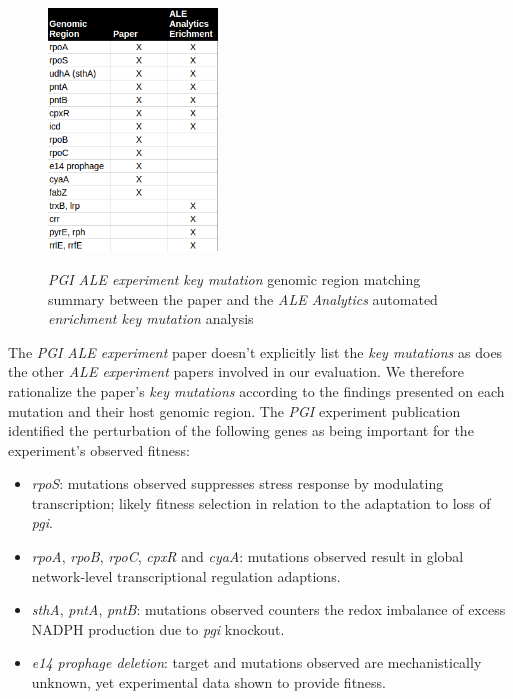\documentclass[12pt,final,masters,chapterheads]{ucsd}  %
\begin{document}
\begin{figure}[H]
  \caption{\textit{PGI} \textit{ALE experiment} \textit{key mutation} genomic region matching summary between the paper and the \textit{ALE Analytics} automated \textit{enrichment key mutation} analysis}
  \centering
  \includegraphics[width=0.4\textwidth]{pgi_key_mutation_regions.png}
    \label{fig:pgi_key_mutation_regions}
\end{figure}
The \textit{PGI} \textit{ALE experiment} paper doesn't explicitly list the \textit{key mutations} as does the other\textit{ ALE experiment} papers involved in our evaluation. We therefore rationalize the paper's \textit{key mutations} according to the findings presented on each mutation and their host genomic region. The \textit{PGI} experiment publication identified the perturbation of the following genes as being important for the experiment's observed fitness:

\begin{itemize}
\item \textit{rpoS}: mutations observed suppresses stress response by modulating transcription; likely fitness selection in relation to the adaptation to loss of \textit{pgi}.
\item \textit{rpoA}, \textit{rpoB}, \textit{rpoC}, \textit{cpxR} and \textit{cyaA}: mutations observed result in global network-level transcriptional regulation adaptions.
\item \textit{sthA}, \textit{pntA}, \textit{pntB}: mutations observed counters the redox imbalance of excess NADPH production due to \textit{pgi} knockout.
\item \textit{e14 prophage deletion}: target and mutations observed are mechanistically unknown, yet experimental data shown to provide fitness.
\end{itemize}
\end{document}
